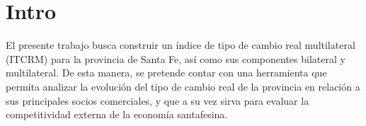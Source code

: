 \section{Intro}\label{section1} 

El presente trabajo busca construir un índice de tipo de cambio real multilateral (ITCRM) para la provincia de Santa Fe, así como sus componentes bilateral y multilateral. De esta manera, se pretende contar con una herramienta que permita analizar la evolución del tipo de cambio real de la provincia en relación a sus principales socios comerciales, y que a su vez sirva para evaluar la competitividad externa de la economía santafesina.
